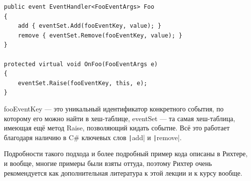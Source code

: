 \documentclass[a5paper]{article}
\begin{document}
\begin{verbatim}
public event EventHandler<FooEventArgs> Foo 
{
    add { eventSet.Add(fooEventKey, value); }
    remove { eventSet.Remove(fooEventKey, value); }
}

protected virtual void OnFoo(FooEventArgs e) 
{
    eventSet.Raise(fooEventKey, this, e);
}
\end{verbatim}

fooEventKey --- это уникальный идентификатор конкретного события, по которому его можно найти в хеш-таблице, eventSet --- та самая хеш-таблица, имеющая ещё метод Raise, позволяющий кидать событие. Всё это работает благодаря наличию в C\# ключевых слов \texttt|add| и \texttt|remove|.

Подробности такого подхода и более подробный пример кода описаны в Рихтере, и вообще, многие примеры были взяты оттуда, поэтому Рихтер очень рекомендуется как дополнительная литература к этой лекции и к курсу вообще.
\end{document}
